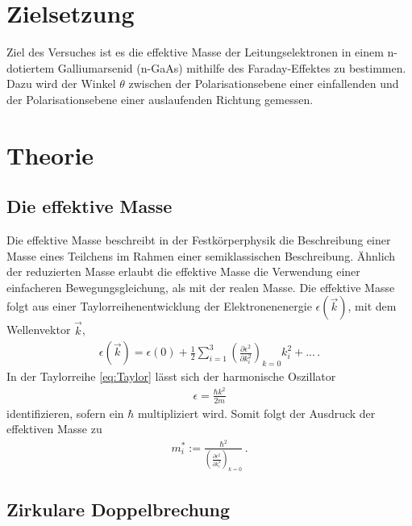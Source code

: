 \section{Zielsetzung}
\label{sec:Ziel}

Ziel des Versuches ist es die effektive Masse der Leitungselektronen in einem n-dotiertem Galliumarsenid (n-GaAs) mithilfe des Faraday-Effektes zu bestimmen.
Dazu wird der Winkel $\theta$ zwischen der Polarisationsebene einer einfallenden und der Polarisationsebene einer auslaufenden Richtung gemessen.

\section{Theorie}
\label{sec:Theorie}

\subsection{Die effektive Masse}
\label{subsec:effektiveMasse}

Die effektive Masse beschreibt in der Festkörperphysik die Beschreibung einer Masse eines Teilchens im Rahmen einer semiklassischen Beschreibung. Ähnlich der reduzierten Masse
erlaubt die effektive Masse die Verwendung einer einfacheren Bewegungsgleichung, als mit der realen Masse.
Die effektive Masse folgt aus einer Taylorreihenentwicklung der Elektronenenergie $\epsilon(\vec k)$, mit dem Wellenvektor $\vec k$, 
\begin{align}
    \epsilon(\vec{k})=\epsilon\left(0\right)+\frac{1}{2}\sum_{i=1}^3\left(\frac{\partial\epsilon^2}{\partial k_i^2}\right)_{k=0}k_i^2+...\,.
    \label{eq:Taylor}
\end{align}
In der Taylorreihe \eqref{eq:Taylor} lässt sich der harmonische Oszillator
\begin{align*}
    \epsilon=\frac{\hbar k^2}{2m}
\end{align*}
identifizieren, sofern ein $\hbar$ multipliziert wird. Somit folgt der Ausdruck der effektiven Masse zu
\begin{align}
    m_i^*:=\frac{\hbar^2}{\left(\frac{\partial\epsilon^2}{\partial k_i^2}\right)_{k=0}}\,.
\end{align}

\subsection{Zirkulare Doppelbrechung}
\label{subsec:ZirkulareDoppelbrechung}

